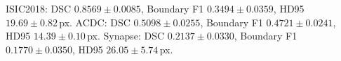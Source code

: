 ISIC2018: DSC $0.8569 \pm 0.0085$, Boundary F1 $0.3494 \pm 0.0359$, HD95 $19.69 \pm 0.82$\,px.
ACDC: DSC $0.5098 \pm 0.0255$, Boundary F1 $0.4721 \pm 0.0241$, HD95 $14.39 \pm 0.10$\,px.
Synapse: DSC $0.2137 \pm 0.0330$, Boundary F1 $0.1770 \pm 0.0350$, HD95 $26.05 \pm 5.74$\,px.
